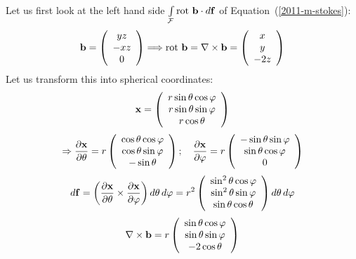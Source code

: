 {\begin{enumerate}
Let us first look at the left hand side $\int \limits_{\cal F} \textrm{rot } {\bf b} \cdot d{\bf f} $
of Equation~(\ref{2011-m-stokes}):
$$
  {\bf b}=
  \left(
    \begin{array}{c}
      yz \\
      -xz \\
      0
    \end{array}
  \right)
  \Longrightarrow
  \textrm{rot } {\bf b} = \nabla \times {\bf b} =
  \left(
    \begin{array}{c}
      x \\
      y \\
      -2z
    \end{array}
  \right)
$$
Let us transform this into spherical coordinates:
$$
  {\bf x}=
  \left(
    \begin{array}{c}
      r\sin \theta \cos \varphi \\
      r\sin \theta \sin \varphi \\
      r\cos \theta
    \end{array}
  \right)
$$
$$
  \Rightarrow
  \frac{\partial {\bf x}}{\partial \theta}=
  r
  \left(
    \begin{array}{c}
      \cos \theta \cos \varphi \\
      \cos \theta \sin \varphi \\
      -\sin \theta
    \end{array}
  \right);\quad
  \frac{\partial {\bf x}}{\partial \varphi}=
  r
  \left(
    \begin{array}{c}
      -\sin \theta \sin \varphi \\
      \sin \theta \cos \varphi \\
      0
    \end{array}
  \right)
$$
$$
  d{\bf f}=
  \left(
    \frac{\partial {\bf x}}{\partial \theta} \times
    \frac{\partial {\bf x}}{\partial \varphi}
  \right)
  d\theta \, d\varphi=
  r^2
  \left(
    \begin{array}{c}
      \sin^2 \theta \cos \varphi \\
      \sin^2 \theta \sin \varphi \\
      \sin \theta \cos \theta
    \end{array}
  \right)
  d\theta \, d\varphi \label{eqn:1.14.1}
$$
$$
  \nabla \times {\bf b}=
  r
  \left(
    \begin{array}{c}
      \sin \theta \cos \varphi \\
      \sin \theta \sin \varphi \\
      -2\cos \theta
    \end{array}
  \right)
$$


\end{enumerate}}
